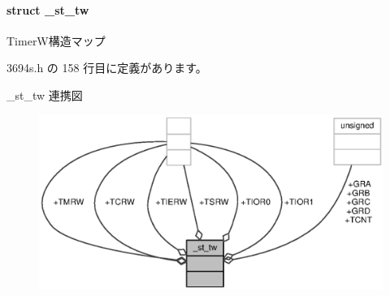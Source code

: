 \paragraph{struct \+\_\+st\+\_\+tw}
Timer\+W構造マップ 

 3694s.\+h の 158 行目に定義があります。



\+\_\+st\+\_\+tw 連携図
\nopagebreak
\begin{figure}[H]
\begin{center}
\leavevmode
\includegraphics[width=350pt]{d9/dee/struct__st__tw__coll__graph}
\end{center}
\end{figure}
